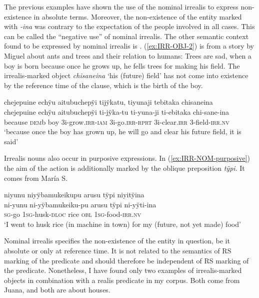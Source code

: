 The previous examples have shown the use of the nominal irrealis to express non-existence in absolute terms. Moreover, the non-existence of the entity marked with \textit{-ina} was contrary to the expectation of the people involved in all cases. This can be called the “negative use” of nominal irrealis. The other semantic context found to be expressed by nominal irrealis is . (\ref{ex:IRR-OBJ-2}) is from a story by Miguel about ants and trees and their relation to humans: Trees are sad, when a boy is born because once he grows up, he fells trees for making his field. The irrealis-marked object \textit{chisaneina} ‘his (future) field’ has not come into existence by the reference time of the clause, which is the birth of the boy.

\ea\label{ex:IRR-OBJ-2}
\begingl 
\glpreamble chejepuine echÿu aitubuchepÿi tijÿkatu, tiyunaji tebitaka chisaneina\\
\gla chejepuine echÿu aitubuchepÿi ti-jÿka-tu ti-yuna-ji ti-ebitaka chi-sane-ina\\ 
\glb because \textsc{dem}b boy 3i-grow.\textsc{irr}-\textsc{iam} 3i-go.\textsc{irr}-\textsc{rprt} 3i-clear.\textsc{irr} 3-field-\textsc{irr.nv}\\ 
\glft ‘because once the boy has grown up, he will go and clear his future field, it is said’
\xe

Irrealis nouns also occur in purposive expressions. In (\ref{ex:IRR-NOM-purposive}) the aim of the action is additionally marked by the oblique preposition \textit{tÿpi}. It comes from María S. 

\ea\label{ex:IRR-NOM-purposive}
\begingl 
\glpreamble niyunu niyÿbamukeikupu arusu tÿpi niyitÿina\\
\gla ni-yunu ni-yÿbamukeiku-pu arusu tÿpi ni-yÿti-ina\\ 
\textsc{sg}-go 1\textsc{sg}-husk-\textsc{dloc} rice \textsc{obl} 1\textsc{sg}-food-\textsc{irr.nv}\\ 
\glft ‘I went to husk rice (in machine in town) for my (future, not yet made) food’
\trailingcitation{[rxx-e120511l.024-025]}
\xe

Nominal irrealis specifies the non-existence of the entity in question, be it absolute or only at reference time. It is not related to the semantics of RS marking of the predicate and should therefore be independent of RS marking of the predicate. Nonetheless, I have found only two examples of irrealis-marked objects in combination with a realis predicate in my corpus. Both come from Juana, and both are about houses.

